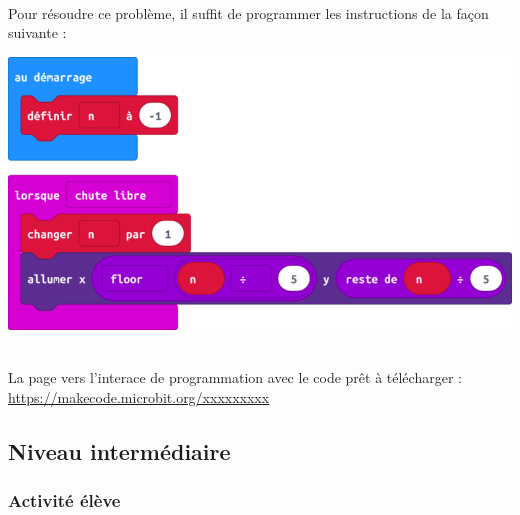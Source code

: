 \begin{minipage}[t]{0.6\linewidth}
    \begin{methode}~\\
        Pour résoudre ce problème, il suffit de programmer les instructions de la façon suivante :
        
        \includegraphics[width=\linewidth]{res/mbChutesN1proposition.png}
    \end{methode}
\end{minipage}
\hfill
\begin{minipage}[t]{0.4\linewidth}
    \begin{remarque}~\\
    La page vers l'interace de programmation avec le code prêt à télécharger :\\ \url{https://makecode.microbit.org/xxxxxxxxx}
    \end{remarque}
\end{minipage}

%
%
\newpage
\subsection{Niveau intermédiaire}
\subsubsection{Activité élève}


